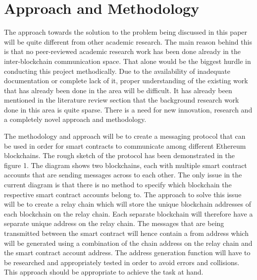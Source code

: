 \documentclass[a4paper,twoside,phd]{BYUPhys}
\begin{document}
\section{Approach and Methodology}
The approach towards the solution to the problem being discussed in this paper will be quite different from other academic research. The main reason behind this is that no peer-reviewed academic research work has been done already in the inter-blockchain communication space. That alone would be the biggest hurdle in conducting this project methodically. Due to the availability of inadequate documentation or complete lack of it, proper understanding of the existing work that has already been done in the area will be difficult. It has already been mentioned in the literature review section that the background research work done in this area is quite sparse. There is a need for new innovation, research and a completely novel approach and methodology.\par
The methodology and approach will be to create a messaging protocol that can be used in order for smart contracts to communicate among different Ethereum blockchains. The rough sketch of the protocol has been demonstrated in the figure 1. The diagram shows two blockchains, each with multiple smart contract accounts that are sending messages across to each other. The only issue in the current diagram is that there is no method to specify which blockchain the respective smart contract accounts belong to. The approach to solve this issue will be to create a relay chain which will store the unique blockchain addresses of each blockchain on the relay chain. Each separate blockchain will therefore have a separate unique address on the relay chain. The messages that are being transmitted between the smart contract will hence contain a from address which will be generated using a combination of the chain address on the relay chain and the smart contract account address. The address generation function will have to be researched and appropriately tested in order to avoid errors and collisions. This approach should be appropriate to achieve the task at hand.
\end{document}
